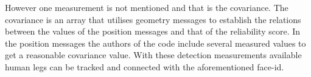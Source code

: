 However one measurement is not mentioned and that is the covariance. The covariance is an array that utilises geometry messages to establish the relations between the values of the position messages and that of the reliability score. In the position messages the authors of the code include several measured values to get a reasonable covariance value. %
With these detection measurements available human legs can be tracked and connected with the aforementioned face-id.\\